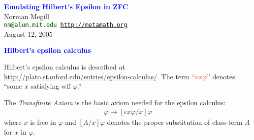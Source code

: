 \documentclass{slides}
\begin{document}
\raggedright
\pagecolor{mint}


\begin{slide}

\begin{center}
\textcolor{blue}{\textbf{\LARGE Emulating Hilbert's Epsilon in ZFC}}\\
\vspace{3ex}
{\large Norman Megill}\\
\vspace{1ex}
\textcolor{darkgreen}{\texttt{nm{}@{}alum.mit.edu\qquad
\url{http://metamath.org}}}\\
\vspace{1ex}
August 12, 2005
\end{center}

\end{slide}


\begin{slide}

\begin{center}
\textcolor{blue}{\textbf{Hilbert's epsilon calculus}}
\end{center}


Hilbert's epsilon calculus is described at
\url{http://plato.stanford.edu/entries/epsilon-calculus/}.
The term ``\textcolor{red}{$\varepsilon x \varphi$}'' denotes ``some $x$ satisfying
wff $\varphi$.''

The {\em Transfinite Axiom} is the basic axiom
needed for the epsilon calculus:
\begin{eqnarray}
\varphi \to [\varepsilon x \varphi / x] \varphi
\end{eqnarray}
where $x$ is free in $\varphi$ and $[A / x]\varphi$ denotes
the proper substitution of class-term $A$ for $x$ in $\varphi$.

\end{slide}
\end{document}
